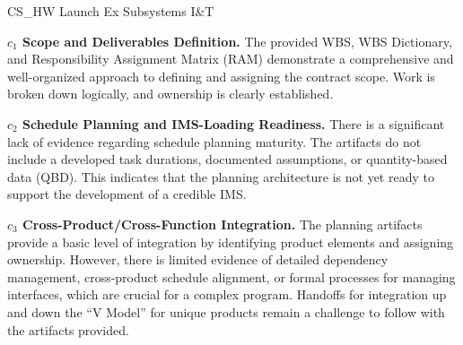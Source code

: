 %
\begin{frame}{CS\_HW Launch Ex Subsystems I\&T}
\begin{minipage}{0.90\textwidth}
\raggedright
\fontsize{8}{9.5}\selectfont
\textbf{\(c_1\) Scope and Deliverables Definition.}
The provided WBS, WBS Dictionary, and Responsibility Assignment Matrix (RAM) demonstrate a comprehensive and well-organized approach to defining and assigning the contract scope. Work is broken down logically, and ownership is clearly established.\par\vspace{0.6em}
\textbf{\(c_2\) Schedule Planning and IMS-Loading Readiness.}
There is a significant lack of evidence regarding schedule planning maturity. The artifacts do not include a developed task durations, documented assumptions, or quantity-based data (QBD). This indicates that the planning architecture is not yet ready to support the development of a credible IMS.\par\vspace{0.6em}
\textbf{\(c_3\) Cross-Product/Cross-Function Integration.}
The planning artifacts provide a basic level of integration by identifying product elements and assigning ownership. However, there is limited evidence of detailed dependency management, cross-product schedule alignment, or formal processes for managing interfaces, which are crucial for a complex program. Handoffs for integration up and down the “V Model” for unique products remain a challenge to follow with the artifacts provided.\par\vspace{0.6em}
\end{minipage}
\end{frame}

\endinput
